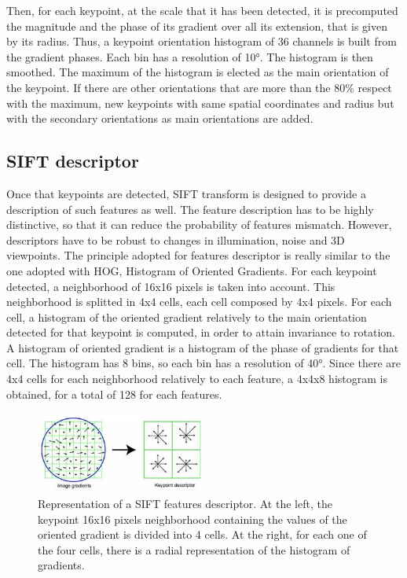 \documentclass[aps,letterpaper,10pt]{revtex4}
\begin{document}
Then, for each keypoint, at the scale that it has been detected, it is precomputed the magnitude and the phase of its gradient over all its extension, that is given by its radius. Thus, a keypoint orientation histogram of 36 channels is built from the gradient phases. Each bin has a resolution of 10°. The histogram is then smoothed. The maximum of the histogram is elected as the main orientation of the keypoint. If there are other orientations that are more than the 80\% respect with the maximum, new keypoints with same spatial coordinates and radius but with the secondary orientations as main orientations are added.

\subsection{SIFT descriptor}
Once that keypoints are detected, SIFT transform is designed to provide a description of such features as well. The feature description has to be highly distinctive, so that it can reduce the probability of features mismatch. However, descriptors have to be robust to changes in illumination, noise and 3D viewpoints. The principle adopted for features descriptor is really similar to the one adopted with HOG, Histogram of Oriented Gradients. For each keypoint detected, a neighborhood of 16x16 pixels is taken into account. This neighborhood is splitted in 4x4 cells, each cell composed by 4x4 pixels. For each cell, a histogram of the oriented gradient relatively to the main orientation detected for that keypoint is computed, in order to attain invariance to rotation. A histogram of oriented gradient is a histogram of the phase of gradients for that cell. The histogram has 8 bins, so each bin has a resolution of 40°. Since there are 4x4 cells for each neighborhood relatively to each feature, a 4x4x8 histogram is obtained, for a total of 128 for each features.

\begin{figure}[h]
	\begin{center}
		\includegraphics[width=0.5\textwidth]{imgs/sift_descriptors.jpeg}
	\end{center}
\caption{Representation of a SIFT features descriptor. At the left, the keypoint 16x16 pixels neighborhood containing the values of the oriented gradient is divided into 4 cells. At the right, for each one of the four cells, there is a radial representation of the histogram of gradients.}
\end{figure}
\end{document}
